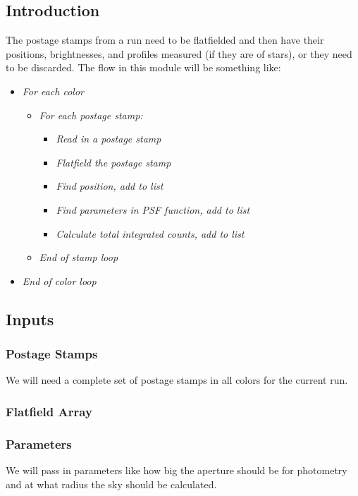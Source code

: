 
\subsection{Introduction}

The postage stamps from a run need to be flatfielded and then have their
positions, brightnesses, and profiles measured (if they are of stars), or
they need to be discarded.  The flow in this module will be something like:
\begin{itemize}
\item {\it For each color}
\begin{itemize}
\item {\it For each postage stamp:}
\begin{itemize}
\item {\it Read in a postage stamp}
\item {\it Flatfield the postage stamp}
\item {\it Find position, add to list}
\item {\it Find parameters in PSF function, add to list}
\item {\it Calculate total integrated counts, add to list}
\end{itemize}
\item {\it End of stamp loop}
\end{itemize}
\item {\it End of color loop}
\end{itemize}

\subsection{Inputs}

\subsubsection{Postage Stamps}

We will need a complete set of postage stamps in all colors for the current
run.

\subsubsection{Flatfield Array}
\subsubsection{Parameters}

We will pass in parameters like how big the aperture should be for
photometry and at what radius the sky should be calculated.

